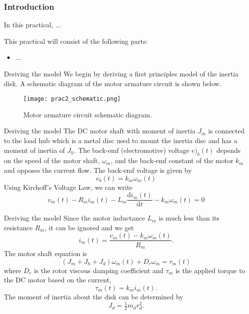 \documentclass[9pt]{beamer-control}
\begin{document}

\begin{frame}
\frametitle{Introduction}
In this practical, ...

\vfill

This practical will consist of the following parts:
\begin{itemize}
\item ...
\end{itemize}
\end{frame}



\begin{frame}{Deriving the model}
We begin by deriving a first principles model of the inertia disk. A schematic diagram of the motor armature circuit is shown below.

\begin{figure}
	\centering
	\texttt{[image: prac2\_schematic.png]}
	\caption{Motor armature circuit schematic diagram.}
\end{figure}
\end{frame}

\begin{frame}{Deriving the model}
The DC motor shaft with moment of inertia $J_m$ is connected to the load hub which is a metal disc used to mount the inertia disc and has a moment of inertia of $J_h$. The back-emf (electromotive) voltage $e)_b(t)$ depends on the speed of the motor shaft, $\omega_m$, and the back-emf constant of the motor $k_m$ and opposes the current flow. The back-emf voltage is given by 
\[e_b(t) = k_m \omega _m (t) \]
Using Kirchoff's Voltage Law, we can write
\[v_m(t) - R_m i_m(t)-L_m \frac{\mathrm{d} i_m(t)}{\mathrm{d} t} - k_m \omega_m (t) = 0\]

\end{frame}

\begin{frame}{Deriving the model}
Since the motor inductance $L_m$ is much less than its resistance $R_m$, it can be ignored and we get
\[i_m(t) = \frac{v_m(t) - k_m \omega_m (t)}{R_m} .\]
The motor shaft equation is
\[(J_m+J_h+J_d)\dot{\omega}_m (t) + D_r \omega _m = \tau_m(t)\]
where $D_r$ is the rotor viscous damping coefficient and $\tau_m$ is the applied torque to the DC motor based on the current,
\[ \tau_m(t) = k_m i_m (t).\]
The moment of inertia about the disk can be determined by
\[J_d = \tfrac{1}{2} m_d r_d^2.\]
\end{frame}
\end{document}
